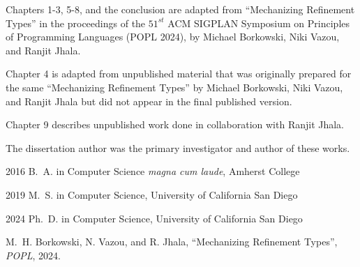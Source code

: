 \begin{frontmatter}
\begin{acknowledgements}
    Chapters 1-3, 5-8, and the conclusion are adapted from 
    ``Mechanizing Refinement Types'' in the proceedings of the 
    $51^{st}$ ACM SIGPLAN Symposium on Principles of Programming
    Languages (POPL 2024), by Michael Borkowski, Niki Vazou, and
    Ranjit Jhala.
    
    Chapter 4 is adapted from unpublished material that was originally
    prepared for the same  ``Mechanizing Refinement Types''
    by Michael Borkowski, Niki Vazou, and Ranjit Jhala but did not 
    appear in the final published version.

    Chapter 9 describes unpublished work done in collaboration with Ranjit Jhala.


    The dissertation author was the primary investigator and author of these works.


\end{acknowledgements}


%
%
\begin{vitapage}
\begin{vita}
  \item[2016] B.~A. in Computer Science \emph{magna cum laude}, Amherst College
  \item[2019] M.~S. in Computer Science, University of California San Diego
  \item[2024] Ph.~D. in Computer Science, University of California San Diego
\end{vita}
\begin{publications}
  \item M.~H. Borkowski, N. Vazou, and R. Jhala, ``Mechanizing Refinement Types'', \emph{POPL}, 2024.
\end{publications}
\end{vitapage}



\end{frontmatter}
